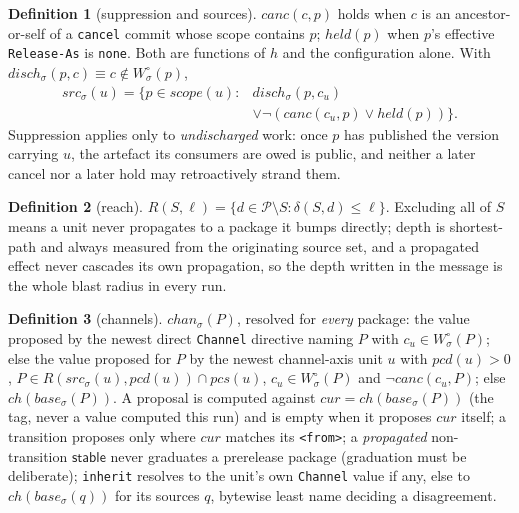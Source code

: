 \documentclass[10pt,conference]{IEEEtran}
\theoremstyle{definition}
\newtheorem{definition}{Definition}
\newcommand{\code}[1]{\texttt{#1}}
\begin{document}
\begin{definition}[suppression and sources]
\label{def:src}
$\mathit{canc}(c,p)$ holds when $c$ is an ancestor-or-self of a
\code{cancel} commit whose scope contains $p$; $\mathit{held}(p)$ when
$p$'s effective \code{Release-As} is \code{none}. Both are functions of
$h$ and the configuration alone. With $\mathit{disch}_\sigma(p,c)
\equiv c \notin W^\circ_\sigma(p)$,
\begin{equation}
\begin{aligned}
  \mathit{src}_\sigma(u) = \{ p \in \mathit{scope}(u) : {}&
    \mathit{disch}_\sigma(p,c_u) \\
    &\lor\lnot(\mathit{canc}(c_u,p) \lor \mathit{held}(p)) \}.
\end{aligned}
  \label{eq:src}
\end{equation}
Suppression applies only to \emph{undischarged} work: once $p$ has
published the version carrying $u$, the artefact its consumers are owed
is public, and neither a later cancel nor a later hold may retroactively
strand them.
\end{definition}

\begin{definition}[reach]
\label{def:reach}
$R(S,\ell) = \{ d \in \mathcal{P} \setminus S : \delta(S,d) \leq \ell
\}$. Excluding all of $S$ means a unit never propagates to a package it
bumps directly; depth is shortest-path and always measured from the
originating source set, and a propagated effect never cascades its own
propagation, so the depth written in the message is the whole blast
radius in every run.
\end{definition}

\begin{definition}[channels]
\label{def:chan}
$\mathit{chan}_\sigma(P)$, resolved for \emph{every} package: the value
proposed by the newest direct \code{Channel} directive naming $P$ with
$c_u \in W^\circ_\sigma(P)$; else the value proposed for $P$ by the newest
channel-axis unit $u$ with $\mathit{pcd}(u) > 0$, $P \in
R(\mathit{src}_\sigma(u), \mathit{pcd}(u)) \cap \mathit{pcs}(u)$,
$c_u \in W^\circ_\sigma(P)$ and $\lnot\mathit{canc}(c_u,P)$; else
$\mathit{ch}(\mathit{base}_\sigma(P))$. A proposal is computed against
$\mathit{cur} = \mathit{ch}(\mathit{base}_\sigma(P))$ (the tag, never
a value computed this run) and is empty when it proposes
$\mathit{cur}$ itself; a transition proposes only where $\mathit{cur}$
matches its \code{<from>}; a \emph{propagated} non-transition
$\mathsf{stable}$ never graduates a prerelease package (graduation must
be deliberate); \code{inherit} resolves to the unit's own
\code{Channel} value if any, else to
$\mathit{ch}(\mathit{base}_\sigma(q))$ for its sources $q$, bytewise
least name deciding a disagreement.
\end{definition}
\end{document}
